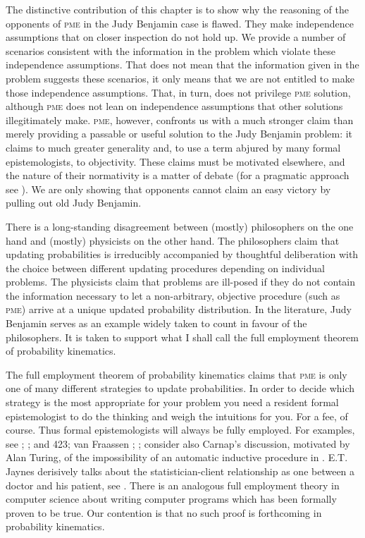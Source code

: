 \documentclass[phd,12pt,oneside]{ubcthesis}
\begin{document}
The distinctive contribution of this chapter is to show why the
reasoning of the opponents of \textsc{pme} in the Judy Benjamin
case is flawed. They make independence assumptions that on closer
inspection do not hold up. We provide a number of scenarios consistent
with the information in the problem which violate these independence
assumptions. That does not mean that the information given in the
problem suggests these scenarios, it only means that we are not
entitled to make those independence assumptions. That, in turn, does
not privilege \textsc{pme} solution, although \textsc{pme}
does not lean on independence assumptions that other solutions
illegitimately make. \textsc{pme}, however, confronts us with a
much stronger claim than merely providing a passable or useful
solution to the Judy Benjamin problem: it claims to much greater
generality and, to use a term abjured by many formal epistemologists,
to objectivity. These claims must be motivated elsewhere, and the
nature of their normativity is a matter of debate (for a pragmatic
approach see ). We are only showing that
opponents cannot claim an easy victory by pulling out old Judy
Benjamin.

There is a long-standing disagreement between (mostly) philosophers on
the one hand and (mostly) physicists on the other hand. The
philosophers claim that updating probabilities is irreducibly
accompanied by thoughtful deliberation with the choice between
different updating procedures depending on individual problems. The
physicists claim that problems are ill-posed if they do not contain
the information necessary to let a non-arbitrary, objective procedure
(such as \textsc{pme}) arrive at a unique updated probability
distribution. In the literature, Judy Benjamin serves as an example
widely taken to count in favour of the philosophers. It is taken to
support what I shall call the full employment theorem of probability
kinematics.

The full employment theorem of probability kinematics claims that
\textsc{pme} is only one of many different strategies to update
probabilities. In order to decide which strategy is the most
appropriate for your problem you need a resident formal epistemologist
to do the thinking and weigh the intuitions for you. For a fee, of
course. Thus formal epistemologists will always be fully employed. For
examples, see ; ;
 and 423; van Fraassen
; ;
consider also Carnap's discussion, motivated by Alan Turing, of the
impossibility of an automatic inductive procedure in
. E.T. Jaynes derisively talks about the
statistician-client relationship as one between a doctor and his
patient, see . There is an
analogous full employment theory in computer science about writing
computer programs which has been formally proven to be true. Our
contention is that no such proof is forthcoming in probability
kinematics.
\end{document}
